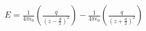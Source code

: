 \documentclass[preview]{standalone}
\begin{document}
\begin{align*}
E = {\frac{1}{4\pi\epsilon _{0} }}  \left ({ \frac{q}{\left ( z-\frac{d}{2} \right )^{2}} }\right )  -  \frac{1}{4\pi\epsilon _{0} }  \left ( {\frac{q}{\left ( z+\frac{d}{2} \right )^{2}} }\right )
\end{align*}
\end{document}
